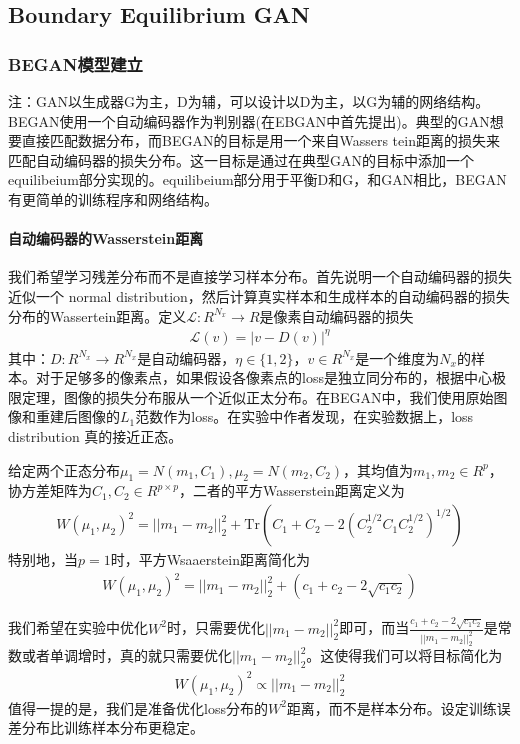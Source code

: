     \subsection{Boundary Equilibrium GAN}
        \subsubsection{BEGAN模型建立}
            \par
            注：GAN以生成器G为主，D为辅，可以设计以D为主，以G为辅的网络结构。
            BEGAN\cite{2017.David}使用一个自动编码器作为判别器(在EBGAN\cite{2016.Junbo}中首先提出)。典型的GAN想要直接匹配数据分布，而BEGAN的目标是用一个来自Wassers tein距离的损失来匹配自动编码器的损失分布。这一目标是通过在典型GAN的目标中添加一个equilibeium部分实现的。equilibeium部分用于平衡D和G，和GAN相比，BEGAN有更简单的训练程序和网络结构。
            \paragraph{自动编码器的Wasserstein距离}我们希望学习残差分布而不是直接学习样本分布。首先说明一个自动编码器的损失近似一个 normal distribution，然后计算真实样本和生成样本的自动编码器的损失分布的Wassertein距离。定义$\mathcal{L}:R^{N_x}\to R$是像素自动编码器的损失
            \begin{align*}
            \mathcal{L}(v) =|v-D(v)|^\eta
            \end{align*}
            其中：$D:R^{N_x}\to R^{N_x}$是自动编码器，$\eta\in \{1,2\}$，$v\in  R^{N_x}$是一个维度为$N_x$的样本。对于足够多的像素点，如果假设各像素点的loss是独立同分布的，根据中心极限定理，图像的损失分布服从一个近似正太分布。在BEGAN中，我们使用原始图像和重建后图像的$L_1$范数作为loss。在实验中作者发现，在实验数据上，loss distribution 真的接近正态。
            \par
            给定两个正态分布$\mu_1 = N(m_1,C_1),\mu_2 = N(m_2,C_2)$，其均值为$m_1,m_2\in R^p$，协方差矩阵为$C_1,C_2\in R^{p\times p}$，二者的平方Wasserstein距离定义为
            \begin{align*}
            W(\mu_1,\mu_2)^2 = ||m_1-m_2||_2^2 + \mathrm{Tr}(C_1+C_2-2(C_2^{1/2}C_1C_2^{1/2})^{1/2})
            \end{align*}
            特别地，当$p=1$时，平方Wsaaerstein距离简化为
            \begin{align*}
            W(\mu_1,\mu_2)^2 = ||m_1-m_2||_2^2 +(c_1+c_2-2\sqrt{c_1c_2})
            \end{align*}
            \par
            我们希望在实验中优化$W^2$时，只需要优化$||m_1-m_2||_2^2$即可，而当$\frac{c_1+c_2-2\sqrt{c_1c_2}}{||m_1-m_2||_2^2}$是常数或者单调增时，真的就只需要优化$||m_1-m_2||_2^2$。这使得我们可以将目标简化为
            \begin{align*}
            W(\mu_1,\mu_2)^2 \propto ||m_1-m_2||_2^2
            \end{align*}
            值得一提的是，我们是准备优化loss分布的$W^2$距离，而不是样本分布。设定训练误差分布比训练样本分布更稳定。
